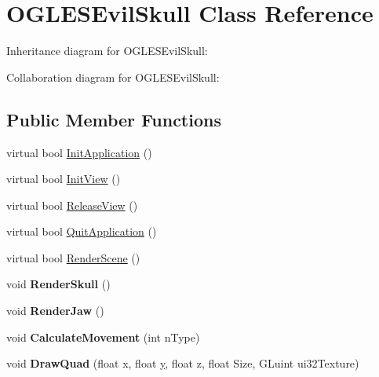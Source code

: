\hypertarget{class_o_g_l_e_s_evil_skull}{\section{O\+G\+L\+E\+S\+Evil\+Skull Class Reference}
\label{class_o_g_l_e_s_evil_skull}
}


Inheritance diagram for O\+G\+L\+E\+S\+Evil\+Skull\+:


Collaboration diagram for O\+G\+L\+E\+S\+Evil\+Skull\+:
\subsection*{Public Member Functions}
\begin{DoxyCompactItemize}
\item 
virtual bool \hyperlink{class_o_g_l_e_s_evil_skull_a5ac529c324cd981d636bedf82ea51e5f}{Init\+Application} ()
\item 
virtual bool \hyperlink{class_o_g_l_e_s_evil_skull_a49d0169987b3b97de24d9cfd52c86a8c}{Init\+View} ()
\item 
virtual bool \hyperlink{class_o_g_l_e_s_evil_skull_a7b2269ec3434d27920c1084edcd199bc}{Release\+View} ()
\item 
virtual bool \hyperlink{class_o_g_l_e_s_evil_skull_ac62a076de3d5710a7b2b3c290e6a22d1}{Quit\+Application} ()
\item 
virtual bool \hyperlink{class_o_g_l_e_s_evil_skull_a5d46e54f03d653a774e30aec4933a04f}{Render\+Scene} ()
\item 
\hypertarget{class_o_g_l_e_s_evil_skull_a18bbb5798b137d77aa2518e7e1817d48}{void {\bfseries Render\+Skull} ()}\label{class_o_g_l_e_s_evil_skull_a18bbb5798b137d77aa2518e7e1817d48}

\item 
\hypertarget{class_o_g_l_e_s_evil_skull_acf79fcbccf854611fce162ef0f60872c}{void {\bfseries Render\+Jaw} ()}\label{class_o_g_l_e_s_evil_skull_acf79fcbccf854611fce162ef0f60872c}

\item 
\hypertarget{class_o_g_l_e_s_evil_skull_ad499126bf0784a4c8267d183761b3450}{void {\bfseries Calculate\+Movement} (int n\+Type)}\label{class_o_g_l_e_s_evil_skull_ad499126bf0784a4c8267d183761b3450}

\item 
\hypertarget{class_o_g_l_e_s_evil_skull_abb7daafa14c87bae3a9d98ce109575b4}{void {\bfseries Draw\+Quad} (float x, float \hyperlink{_ice_utils_8h_aa7ffaed69623192258fb8679569ff9ba}{y}, float z, float Size, G\+Luint ui32\+Texture)}\label{class_o_g_l_e_s_evil_skull_abb7daafa14c87bae3a9d98ce109575b4}


\end{DoxyCompactItemize}
